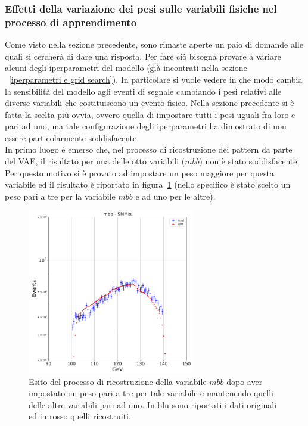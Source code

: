 \newpage

\subsubsection{Effetti della variazione dei pesi sulle variabili fisiche nel processo di apprendimento}
\label{effetti variazione pesi}

Come visto nella sezione precedente, sono rimaste aperte un paio di domande alle quali si cercherà di dare una risposta. Per fare ciò bisogna provare a variare alcuni degli iperparametri del modello (già incontrati nella sezione ~\ref{iperparametri e grid search}). In particolare si vuole vedere in che modo cambia la sensibilità del modello agli eventi di segnale cambiando i pesi relativi alle diverse variabili che costituiscono un evento fisico. Nella sezione precedente si è fatta la scelta più ovvia, ovvero quella di impostare tutti i pesi uguali fra loro e pari ad uno, ma tale configurazione degli iperparametri ha dimostrato di non essere particolarmente soddisfacente. \\
In primo luogo è emerso che, nel processo di ricostruzione dei pattern da parte del VAE, il risultato per una delle otto variabili ($\textit{mbb}$) non è stato soddisfacente. Per questo motivo si è provato ad impostare un peso maggiore per questa variabile ed il risultato è riportato in figura~\ref{mbb_ottimizzazione} (nello specifico è stato scelto un peso pari a tre per la variabile $\textit{mbb}$ e ad uno per le altre).

\begin{figure}[h!]
	\centering
	\includegraphics[width=0.65\textwidth]{figs/risultati_simulazione/verifica_mbb.png}
	\caption{Esito del processo di ricostruzione della variabile $\textit{mbb}$ dopo aver impostato un peso pari a tre per tale variabile e mantenendo quelli delle altre variabili pari ad uno. In blu sono riportati i dati originali ed in rosso quelli ricostruiti.}
	\label{mbb_ottimizzazione}
\end{figure}

